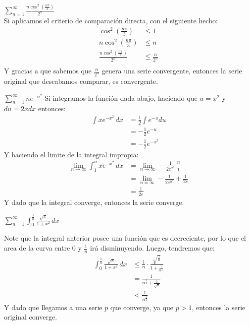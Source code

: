 \documentclass[../main.tex]{subfiles}
\begin{document}
\question $\sum\limits_{n = 1}^\infty \frac{n \cos^2\left(\frac{n\pi}{3}\right)}{2^n}$\\

Si aplicamos el criterio de comparación directa, con el siguiente hecho:
\begin{align*}
    \cos^2\left(\frac{n\pi}{3}\right) &\le 1\\
    n\cos^2\left(\frac{n\pi}{3}\right) &\le n\\
    \frac{n\cos^2\left(\frac{n\pi}{3}\right)}{2^n} &\le \frac{n}{2^n}\\
\end{align*}
Y gracias a que sabemos que $\frac{n}{2^n}$ genera una serie convergente, entonces la serie original que deseabamos comparar, es convergente.

\question $\sum\limits_{n = 1}^\infty ne^{-n^2}$
Si integramos la función dada abajo, haciendo que $u = x^2$ y $du = 2x dx$ entonces:
\begin{align*}
    \int xe^{-x^2} \, dx &= \frac{1}{2} \int e^{-u} du\\
    &= -\frac{1}{2} e^{-u}\\
    &= -\frac{1}{2} e^{-x^2}
\end{align*}
Y haciendo el limite de la integral impropia:
\begin{align*}
    \lim_{n \to \infty} \int_{1}^n xe^{-x^2} \, dx &= \lim_{n \to \infty} -\frac{1}{2e^{x^2}} |_{1}^n\\
    &= \lim_{n = \infty} -\frac{1}{2e^{n^2}} + \frac{1}{2e}\\
    &= \frac{1}{2e}
\end{align*}
Y dado que la integral converge, entonces la serie converge.

\question $\sum\limits_{n = 1}^\infty \int_{0}^{\frac{1}{n}} \frac{\sqrt{x}}{1+x^2} \, dx$

Note que la integral anterior posee una función que es decreciente, por lo que el area de la curva entre $0$ y $\frac{1}{n}$ irá disminuyendo. Luego, tendremos que:
\begin{align*}
    \int_{0}^{\frac{1}{n}} \frac{\sqrt{x}}{1+x^2} \, dx &\le \frac{1}{n} \cdot \frac{\sqrt{\frac{1}{n}}}{1 + \frac{1}{n^2}}\\
    &= \frac{1}{n^{\frac{3}{2}} + \frac{1}{\sqrt{n}}}\\
    &< \frac{1}{n^{\frac{3}{2}}}
\end{align*}
Y dado que llegamos a una serie $p$ que converge, ya que $p > 1$, entonces la serie original converge.
\end{document}
